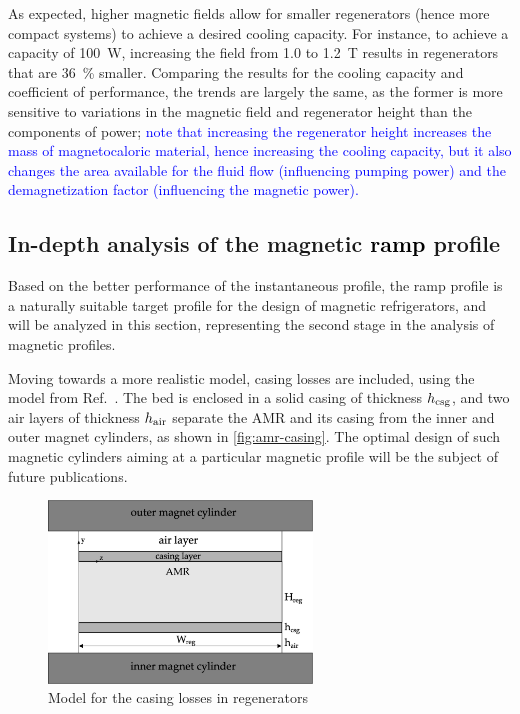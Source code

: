 \documentclass[referee]{svjour3}
\begin{document}
As expected, higher magnetic fields allow for smaller regenerators (hence more compact systems) to achieve a desired cooling capacity. For instance, to achieve a capacity of \SI{100}{\watt}, increasing the field from \num{1.0} to \SI{1.2}{\tesla} results in regenerators that are \SI{36}{\percent} smaller. Comparing the results for the cooling capacity and coefficient of performance, the trends are largely the same, as the former is more sensitive to variations in the magnetic field and regenerator height than the components of power; \textcolor{blue}{note that 
increasing the regenerator height increases the  mass of magnetocaloric material, hence increasing the cooling capacity, but it also changes the area available for the fluid flow (influencing pumping power) and the demagnetization factor (influencing the magnetic power).}

\subsection{In-depth analysis of the  magnetic \textcolor{black}{ramp} profile}
\label{sec:performance-an-amr-1}

Based on the better performance of the instantaneous profile, the ramp profile is a naturally suitable target profile for the design of magnetic refrigerators, and will be analyzed in this section, representing the second stage in the analysis of magnetic profiles.

Moving towards a more realistic model, casing losses are included, using the model from Ref.~\cite{bib:trevizoli16_perfor_model}. The bed is enclosed in a solid casing of thickness $h_{\mathrm{csg}}$, and two air layers of thickness $h_{\mathrm{air}}$ separate the AMR and its casing from the inner and outer magnet cylinders, as shown in \autoref{fig:amr-casing}. The optimal design of such magnetic cylinders aiming at a particular magnetic profile  will be the subject of future publications. 

\begin{figure}[!ht]
  \centering
  \includegraphics[width=7cm]{Fig12-amr-casing}
  \caption{Model for the casing losses in regenerators}
  \label{fig:amr-casing}
\end{figure}
\end{document}
